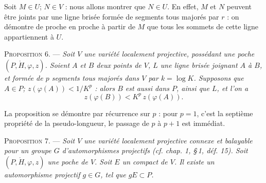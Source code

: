 \documentclass[11pt]{article}
\newcommand{\bzcf}[2]{#1}
\newenvironment{prop}[1][]{\par\medskip\noindent\textsc{Proposition #1.} --- \itshape}{\par\medskip}
\newenvironment{proof}[1][]{\par}{\par}
\begin{document}
\begin{proof}
Soit $M\in U$; $N\in V$ : nous allons montrer que $N\in U$. En effet, $M$ et $N$ peuvent être
joints par une ligne brisée formée de segments tous majorés par $r$ : on démontre de proche en
proche à partir de $M$ que tous les sommets de cette ligne appartiennent à $U$.
\end{proof}

\begin{prop}[6]
Soit $V$ une variété localement projective, possédant une poche $(P, \mathring{H}, \varphi, z)$.
Soient $A$ et $B$ deux points de $V$, $L$ une ligne brisée joignant $A$ à $B$, et formée de $p$
segments tous majorés dans $V$ par $k=\log K$. Supposons que $A\in P$; $z(\varphi(A))<1/K^p$ :
alors $B$ est aussi dans $P$, ainsi que $L$, et l'on a
\[ z(\varphi(B))<K^p\,z(\varphi(A)). \]
\end{prop}

\begin{proof}
La proposition se démontre par récurrence sur $p$ : pour $p=1$, c'est \bzcf{la septième propriété
de la pseudo-longueur}{\ref{bzthm:c2s2_proprietes_pseudo_longueur}}, le passage de $p$ à $p+1$ est
immédiat.
\end{proof}

\begin{prop}[7]
Soit $V$ une variété localement projective connexe et balayable pour un groupe $G$
d'automorphismes projectifs (\bzcf{\textit{cf.} chap. 1, \S\,1, déf.
15}{\ref{bzdef:c1s1d15_homogene_balayable_divisible}}). Soit $(P, \mathring{H}, \varphi, z)$ une
poche de $V$. Soit $E$ un compact de $V$. Il existe un automorphisme projectif $g\in G$, tel que
$gE\subset P$.
\end{prop}
\end{document}
